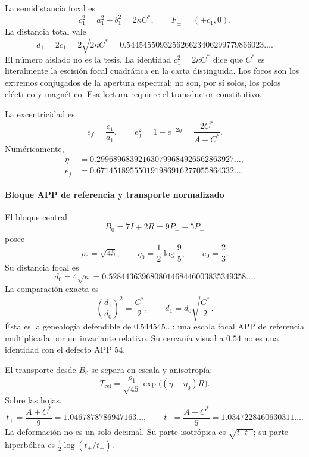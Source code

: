La semidistancia focal es
\begin{equation}
c_1^2=a_1^2-b_1^2=2\kappa C^*,
\qquad
F_\pm=(\pm c_1,0).
\label{eq:focos}
\end{equation}
La distancia total vale
\begin{equation}
d_1=2c_1=2\sqrt{2\kappa C^*}
=0.544545509325626623406299779866023\ldots.
\label{eq:d1}
\end{equation}
El número aislado no es la tesis. La identidad \(c_1^2=2\kappa C^*\) dice que
\(C^*\) es literalmente la escisión focal cuadrática en la carta
distinguida. Los focos son los extremos conjugados de la apertura espectral;
no son, por sí solos, los polos eléctrico y magnético. Esa lectura requiere
el transductor constitutivo.

La excentricidad es
\begin{equation}
e_f=\frac{c_1}{a_1},\qquad
e_f^2=1-e^{-2\eta}=\frac{2C^*}{A+C^*}.
\label{eq:excentricidad}
\end{equation}
Numéricamente,
\[
\begin{aligned}
\eta&=0.299689683921630799684926562863927\ldots,\\
e_f&=0.671451895550191986916277055864332\ldots.
\end{aligned}
\]

\paragraph{Bloque APP de referencia y transporte normalizado}

El bloque central
\[
B_0=7I+2R=9P_++5P_-
\]
posee
\[
\rho_0=\sqrt{45},\qquad
\eta_0=\frac12\log\frac95,\qquad
e_0=\frac23.
\]
Su distancia focal es
\[
d_0=4\sqrt\kappa
=0.528443639680801468446003835349358\ldots.
\]
La comparación exacta es
\begin{equation}
\boxed{\left(\frac{d_1}{d_0}\right)^2=\frac{C^*}{2}},
\qquad
d_1=d_0\sqrt{\frac{C^*}{2}}.
\label{eq:invariante-focal-relativo}
\end{equation}
Ésta es la genealogía defendible de \(0.544545\ldots\): una escala focal APP
de referencia multiplicada por un invariante relativo. Su cercanía visual a
\(0.54\) no es una identidad con el defecto APP \(54\).

El transporte desde \(B_0\) se separa en escala y anisotropía:
\begin{equation}
T_{\mathrm{rel}}=\frac{\rho_1}{\sqrt{45}}
\exp\bigl((\eta-\eta_0)R\bigr).
\label{eq:transporte-rel}
\end{equation}
Sobre las hojas,
\[
t_+=\frac{A+C^*}{9}=1.0467878786947163\ldots,
\qquad
t_-=\frac{A-C^*}{5}=1.0347228460630311\ldots.
\]
La deformación no es un solo decimal. Su parte isotrópica es
\(\sqrt{t_+t_-}\); su parte hiperbólica es
\(\tfrac12\log(t_+/t_-)\).

